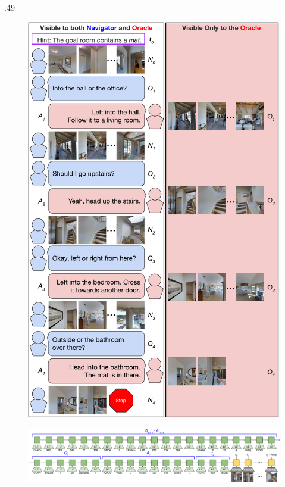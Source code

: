\documentclass[final]{beamer}
\newcommand{\setblocksize}{\LARGE \centering}
\newcommand{\centercolumnwidth}{.49}
\begin{document}
\begin{frame}{}
\begin{columns}[t]
\begin{column}{\centercolumnwidth\linewidth}
\begin{block}{\setblocksize }
{\begin{figure}[!t]
  \centering
  \includegraphics[width=\linewidth]{figures/full_demo_vertical.pdf}
\end{figure}

\begin{figure}
  \centering
  \includegraphics[width=\linewidth]{figures/model.pdf}    
\end{figure}

}
\end{block}
\end{column}
\end{columns}
\end{frame}
\end{document}
